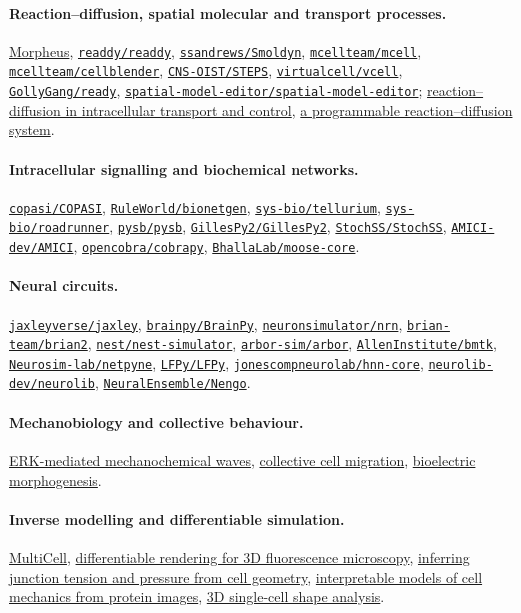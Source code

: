 \documentclass[11pt]{article}
\newcommand{\ghrepo}[2]{\href{https://github.com/#1/#2}{\texttt{#1/\allowbreak#2}}}
\begin{document}
\paragraph{Reaction--diffusion, spatial molecular and transport processes.}
\href{https://morpheus.gitlab.io}{Morpheus},
\ghrepo{readdy}{readdy},
\ghrepo{ssandrews}{Smoldyn},
\ghrepo{mcellteam}{mcell},
\ghrepo{mcellteam}{cellblender},
\ghrepo{CNS-OIST}{STEPS},
\ghrepo{virtualcell}{vcell},
\ghrepo{GollyGang}{ready},
\ghrepo{spatial-model-editor}{spatial-model-editor};
\href{https://doi.org/10.1002/anie.200905513}{reaction--diffusion in intracellular transport and control},
\href{https://doi.org/10.1016/j.cell.2023.12.007}{a programmable reaction--diffusion system}.

\paragraph{Intracellular signalling and biochemical networks.}
\ghrepo{copasi}{COPASI},
\ghrepo{RuleWorld}{bionetgen},
\ghrepo{sys-bio}{tellurium},
\ghrepo{sys-bio}{roadrunner},
\ghrepo{pysb}{pysb},
\ghrepo{GillesPy2}{GillesPy2},
\ghrepo{StochSS}{StochSS},
\ghrepo{AMICI-dev}{AMICI},
\ghrepo{opencobra}{cobrapy},
\ghrepo{BhallaLab}{moose-core}.

\paragraph{Neural circuits.}
\ghrepo{jaxleyverse}{jaxley},
\ghrepo{brainpy}{BrainPy},
\ghrepo{neuronsimulator}{nrn},
\ghrepo{brian-team}{brian2},
\ghrepo{nest}{nest-simulator},
\ghrepo{arbor-sim}{arbor},
\ghrepo{AllenInstitute}{bmtk},
\ghrepo{Neurosim-lab}{netpyne},
\ghrepo{LFPy}{LFPy},
\ghrepo{jonescompneurolab}{hnn-core},
\ghrepo{neurolib-dev}{neurolib},
\ghrepo{NeuralEnsemble}{Nengo}.

\paragraph{Mechanobiology and collective behaviour.}
\href{https://doi.org/10.1016/j.devcel.2020.05.011}{ERK-mediated mechanochemical waves},
\href{https://doi.org/10.1146/annurev-conmatphys-031218-013516}{collective cell migration},
\href{https://doi.org/10.1016/j.cell.2021.02.034}{bioelectric morphogenesis}.

\paragraph{Inverse modelling and differentiable simulation.}
\href{https://doi.org/10.1038/s41592-025-02983-x}{MultiCell},
\href{https://arxiv.org/abs/2303.10440}{differentiable rendering for 3D fluorescence microscopy},
\href{https://doi.org/10.1242/dev.192773}{inferring junction tension and pressure from cell geometry},
\href{https://doi.org/10.1016/j.cell.2023.11.041}{interpretable models of cell mechanics from protein images},
\href{https://doi.org/10.1101/2022.06.17.496550}{3D single-cell shape analysis}.
\end{document}

